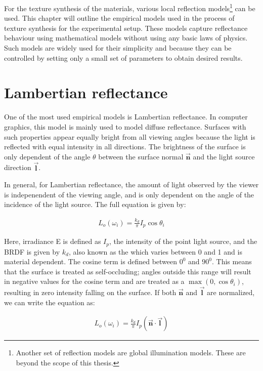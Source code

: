 \hypertarget{empiricalModels}{
}

\noindent For the texture synthesis of the materials, various local reflection models\footnote[1]{Another set of reflection models are global illumination models. These are beyond the scope of this thesis.} can be used. This chapter will outline the empirical models used in the process of texture synthesis for the experimental setup. These models capture reflectance behaviour using mathematical models without using any basic laws of physics. Such models are widely used for their simplicity and because they can be controlled by setting only a small set of parameters to obtain desired results.

\section{Lambertian reflectance}\label{sec:Lambertian}
	One of the most used empirical models is Lambertian reflectance. In computer graphics, this model is mainly used to model diffuse reflectance. Surfaces with such properties appear equally bright from all viewing angles because the light is reflected with equal intensity in all directions. The brightness of the surface is only dependent of the angle $\theta$ between the surface normal $\vec{\mathbf{n}}$ and the light source direction $\vec{\mathbf{l}}$. 

In general, for Lambertian reflectance, the amount of light observed by the viewer is indepenendent of the viewing angle, and is only dependent on the angle of the incidence of the light source. The full equation is given by:

		\begin{eqnarray*}
			L_o(\omega_i) = \frac{k_d}{\pi}I_p\cos\theta_i
		\end{eqnarray*}

Here, irradiance E is defined as $I_p$, the intensity of the point light source, and the BRDF is given by $k_d$, also known as the  which varies between 0 and 1 and is material dependent. The cosine term is defined between $0^0$ and $90^0$. This means that the surface is treated as self-occluding; angles outside this range will result in negative values for the cosine term and are treated as a $\max({0,\cos\theta_i})$, resulting in zero intensity falling on the surface. If both $\vec{\mathbf{n}}$ and $\vec{\mathbf{l}}$ are normalized, we can write the equation as:

		\begin{eqnarray*}
			L_o(\omega_i) = \frac{k_d}{\pi}I_p(\vec{\mathbf{n}} \cdot \vec{\mathbf{l}})
		\end{eqnarray*}

